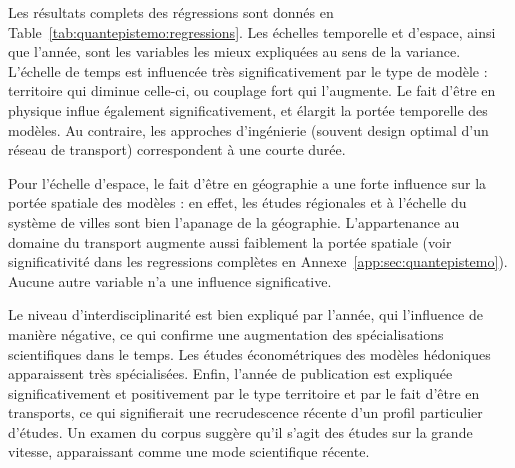 Les résultats complets des régressions sont donnés en Table~\ref{tab:quantepistemo:regressions}. Les échelles temporelle et d'espace, ainsi que l'année, sont les variables les mieux expliquées au sens de la variance. L'échelle de temps est influencée très significativement par le type de modèle : territoire qui diminue celle-ci, ou couplage fort qui l'augmente. Le fait d'être en physique influe également significativement, et élargit la portée temporelle des modèles. Au contraire, les approches d'ingénierie (souvent design optimal d'un réseau de transport) correspondent à une courte durée.

Pour l'échelle d'espace, le fait d'être en géographie a une forte influence sur la portée spatiale des modèles : en effet, les études régionales et à l'échelle du système de villes sont bien l'apanage de la géographie. L'appartenance au domaine du transport augmente aussi faiblement la portée spatiale (voir significativité dans les regressions complètes en Annexe~\ref{app:sec:quantepistemo}). Aucune autre variable n'a une influence significative.
 
Le niveau d'interdisciplinarité est bien expliqué par l'année, qui l'influence de manière négative, ce qui confirme une augmentation des spécialisations scientifiques dans le temps. Les études économétriques des modèles hédoniques apparaissent très spécialisées. Enfin, l'année de publication est expliquée significativement et positivement par le type territoire et par le fait d'être en transports, ce qui signifierait une recrudescence récente d'un profil particulier d'études. Un examen du corpus suggère qu'il s'agit des études sur la grande vitesse, apparaissant comme une mode scientifique récente.




